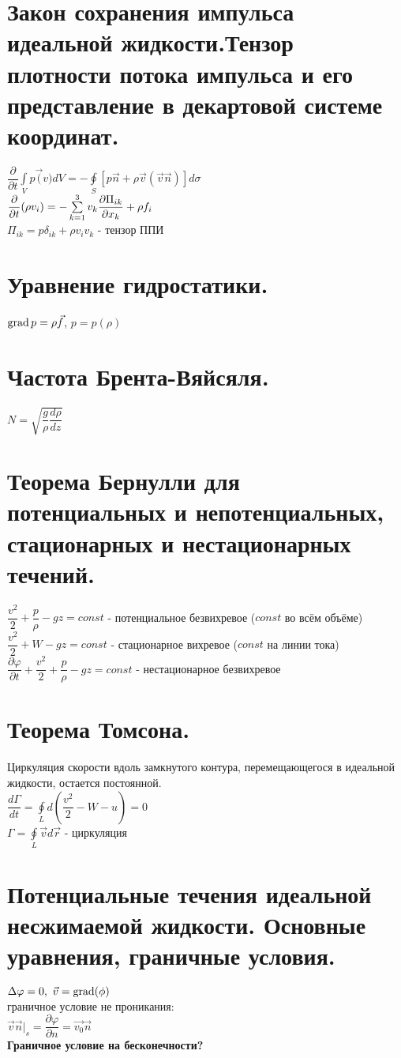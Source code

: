 \begin{multicols*}{3}
		\section{Закон сохранения импульса идеальной жидкости.Тензор плотности потока импульса и его представление в декартовой системе координат.}
		$ \dfrac{\partial}{\partial t}\int\limits_V p\vec(v)dV=-\oint\limits_S \left[p\vec{n}+\rho\vec{v}(\vec{v}\vec{n})\right]d\sigma$ \\
		$ \dfrac{\partial}{\partial t}(\rho v_i)=-\sum\limits_{k=1}^3v_k\dfrac{\partial \Pi_{ik}}{\partial x_k}+\rho f_i $ \\
		$ \Pi_{ik} = p\delta_{ik}+\rho v_iv_k$ - тензор ППИ
		
		\section{Уравнение гидростатики.}
		$\operatorname{grad} p=\rho\vec{f}$, 
		$p=p(\rho)$
		
		\section{Частота Брента-Вяйсяля.}
		$N=\sqrt{\dfrac{g}{\rho}\dfrac{d\rho}{dz}}$
		
		\section{Теорема Бернулли для потенциальных и непотенциальных, стационарных и нестационарных течений.} 
		$\dfrac{v^2}{2}+\dfrac{p}{\rho}-gz=const$ - потенциальное безвихревое ($const$ во всём объёме)\\
		$\dfrac{v^2}{2}+W-gz=const$ - стационарное вихревое ($const$ на линии тока)\\
		$\dfrac{\partial \varphi}{\partial t}+\dfrac{v^2}{2}+\dfrac{p}{\rho}-gz=const$ - нестационарное безвихревое \\
		
		\section{Теорема Томсона.}
		Циркуляция скорости вдоль замкнутого контура, перемещающегося в идеальной жидкости, остается постоянной. \\
		$\dfrac{d\Gamma}{dt}=\oint\limits_Ld\left(\dfrac{v^2}{2}-W-u\right)=0$ \\
		$\Gamma = \oint\limits_L\vec{v}d\vec{r}$ - циркуляция
		
		\section{Потенциальные течения идеальной несжимаемой жидкости. Основные уравнения, граничные условия.}
		$\Delta \varphi=0,~\vec{v}=\operatorname{grad}(\phi)$ \\
		граничное условие не проникания: \\
		$\vec{v}\vec{n}|_s=\dfrac{\partial\varphi}{\partial n}=\vec{v_0}\vec{n}$ \\
		\textbf{Граничное условие на бесконечности?}
		

\end{multicols*}
